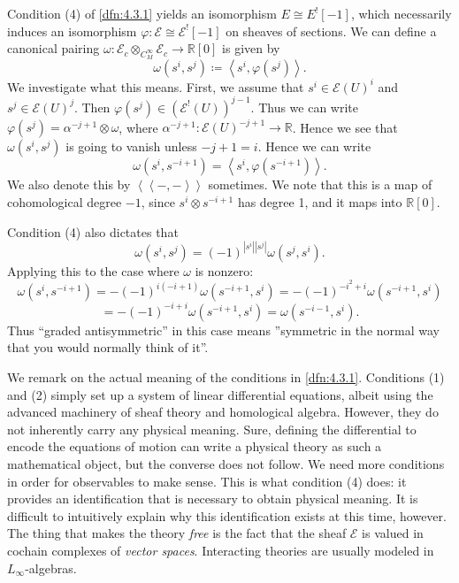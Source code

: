 \begin{remark}\label{rmk:4.3.4}
	Condition (4) of \cref{dfn:4.3.1} yields an isomorphism $E\cong E^![-1]$, which necessarily induces an isomorphism $\varphi : \mathcal{E} \cong \mathcal{E} ^![-1]$ on sheaves of sections. We can define a canonical pairing $\omega : \mathcal{E} _c\otimes_{C^\infty _M} \mathcal{E}_c \to \mathbb{R} [0]$ is given by
	\[
		\omega (s^i,s^j) \coloneqq \left\langle s^i,\varphi (s^j) \right\rangle 
	.\]
	We investigate what this means. First, we assume that $s^i\in \mathcal{E} (U)^i$ and $s^j\in \mathcal{E} (U)^j$. Then $\varphi (s^j)\in (\mathcal{E} ^!(U))^{j-1} $. Thus we can write $\varphi (s^j) = \alpha ^{-j+1} \otimes \omega $, where $\alpha ^{-j+1} : \mathcal{E} (U)^{-j+1}  \to \mathbb{R} $. Hence we see that $\omega (s^i,s^j)$ is going to vanish unless $-j+1=i$. Hence we can write
	\[
		\omega (s^{i} ,s^{-i+1} ) = \left\langle s^i,\varphi (s^{-i+1} ) \right\rangle 
	.\]
	We also denote this by $\left\langle \left\langle -,- \right\rangle  \right\rangle $ sometimes. We note that this is a map of cohomological degree $-1$, since $s^i \otimes s^{-i+1} $ has degree 1, and it maps into $\mathbb{R} [0]$.

	Condition (4) also dictates that
	\[
		\omega (s^i,s^j) = (-1)^{\left| s^i \right| \left| s^j \right| } \omega (s^j,s^i)
	.\]
	Applying this to the case where $\omega $ is nonzero:
	\[
		\omega (s^i,s^{-i+1} ) = -(-1)^{i(-i+1)} \omega (s^{-i+1} ,s^i) = -(-1)^{-i^2 + i} \omega (s^{-i+1} ,s^i) 
	\]
	\[
		=-(-1)^{-i+i} \omega (s^{-i+1} ,s^i) = \omega (s^{-i-1} ,s^i)
	.\]
	Thus ``graded antisymmetric'' in this case means ''symmetric in the normal way that you would normally think of it''.
\end{remark}

\begin{remark}\label{4.3.5}
	We remark on the actual meaning of the conditions in \cref{dfn:4.3.1}. Conditions (1) and (2) simply set up a system of linear differential equations, albeit using the advanced machinery of sheaf theory and homological algebra. However, they do not inherently carry any physical meaning. Sure, defining the differential to encode the equations of motion can write a physical theory as such a mathematical object, but the converse does not follow. We need more conditions in order for observables to make sense. This is what condition (4) does: it provides an identification that is necessary to obtain physical meaning. It is difficult to intuitively explain why this identification exists at this time, however. The thing that makes the theory \emph{free} is the fact that the sheaf $\mathcal{E} $ is valued in cochain complexes of \emph{vector spaces}. Interacting theories are usually modeled in $L_\infty $-algebras.
\end{remark}


